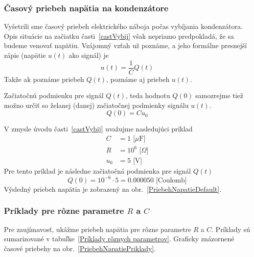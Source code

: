 \documentclass[a4paper, 10pt, ]{article}
\begin{document}
\subsubsection{Časový priebeh napätia na kondenzátore}


Vyšetrili sme časový priebeh elektrického náboja počas vybíjania kondenzátora. Opis situácie na začiatku časti~\ref{castVybij} však nepriamo predpokladá, že sa budeme venovať napätiu. Vzájomný vzťah už poznáme, a jeho formálne presnejší zápis (napätie $u(t)$ ako signál) je
\begin{equation} \label{QUsig}
    u(t) = \frac{1}{C} Q(t)
\end{equation}
Takže ak poznáme priebeh $Q(t)$, poznáme aj priebeh $u(t)$.

Začiatočnú podmienku pre signál $Q(t)$, teda hodnotu $Q(0)$ samozrejme tiež možno určiť so želanej (danej) začiatočnej podmienky signálu $u(t)$.
\begin{equation}
    Q(0) = C u_0
\end{equation}





\bigskip

\noindent
V zmysle úvodu časti~\ref{castVybij} uvažujme nasledujúci príklad
\begin{align*}
    C &= 1 \text{ [$\mu$F]} \\
    R &= 10^6  \text{ [$\Omega$]} \\
    u_0 &= 5  \text{ [V]}
\end{align*}
Pre tento príklad je následne začiatočná podmienka pre signál $Q(t)$
\begin{equation}
    Q(0) = 10^{-6} \cdot 5 = 0.000050 \text{ [Coulomb]}
\end{equation}
Výsledný priebeh napätia je zobrazený na obr.~\ref{PriebehNapatieDefault}.









\subsubsection{Príklady pre rôzne parametre $R$ a $C$}


Pre zaujímavosť, ukážme priebeh napätia pre rôzne parametre $R$ a $C$. Príklady sú sumarizované v tabuľke~\ref{Príklady rôznych parametrov}. Graficky znázornené časové priebehy na obr.~\ref{PriebehNapatiePriklady}.
\end{document}
